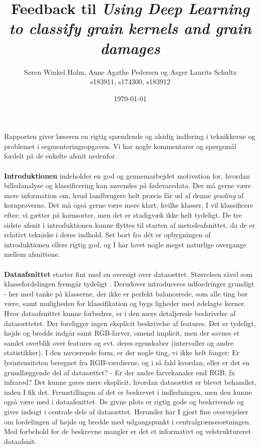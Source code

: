 \documentclass[12pt,fleqn,]{article}
\title{\vspace*{-4cm}Feedback til \textit{
		Using Deep Lear​ning to classif​y grain kernels​ and grain dama​ges}}
\author{Søren Winkel Holm, Anne Agathe Pedersen og Asger Laurits Schultz\\
s183911, s174300, s183912}
\date{\today}
\begin{document}
\maketitle
\noindent
Rapporten giver læseren en rigtig spændende og alsidig indføring i teknikkerne og problemet i segmenteringsopgaven. Vi har nogle kommentarer og spørgsmål fordelt på de enkelte afsnit nedenfor.
\\
\\
\textbf{Introduktionen} indeholder en god og gennemarbejdet motivation for, hvordan billedanalyse og klassificering kan anvendes på fødevaredata. Der må gerne være mere information om, hvad landbrugere helt præcis får ud af denne \textit{grading} af kornprøverne. Det må også gerne være mere klart, hvilke klasser, I vil klassificere efter; vi gætter på kornsorter, men det er stadigvæk ikke helt tydeligt. De tre sidste afsnit i introduktionen kunne flyttes til starten af metodeafsnittet, da de er relativt tekniske i deres indhold. Set bort fra dét er opbygningen af introduktionen ellers rigtig god, og I har lavet nogle meget naturlige overgange mellem afsnittene. 
\\
\\
\textbf{Dataafsnittet} starter fint med en oversigt over datasættet. Størrelsen såvel som klassefordelingen fremgår tydeligt . Derudover introduceres udfordringer grundigt - her med tanke på klasserne, der ikke er perfekt balancerede, som alle ting bør være, samt muligheden for klassifikation og bygs ligheder med ødelagte kerner. Hvor dataafsnittet kunne forbedres, er i den mere detaljerede beskrivelse af datasættetet. Der foreligger ingen eksplicit beskrivelse af features. Det er tydeligt, højde og bredde indgår samt RGB-farver, omend implicit, men der savnes et samlet overblik over features og evt. deres egenskaber (intervaller og andre statistikker). I den nuværende form, er der nogle ting, vi ikke helt fanger: Er lysintensiteten beregnet fra RGB-værdierne, og i så fald hvordan, eller er det en grundlæggende del af datasættet? - Er der andre farvekanaler end RGB, fx infrarød? Det kunne gøres mere eksplicit, hvordan datasættet er blevet behandlet, inden I fik det. Fremstillingen af det er beskrevet i indledningen, men den kunne også være med i dataafsnittet. De givne plots er rigtig gode og beskrivende og giver indsigt i centrale dele af datasættet. Herunder har I gjort fine overvejelser om fordelingen af højde og bredde med udgangspunkt i centralgrænsesætningen. Med forbehold for de beskrevne mangler er det et informativt og velstruktureret dataafsnit.
\\
\end{document}
